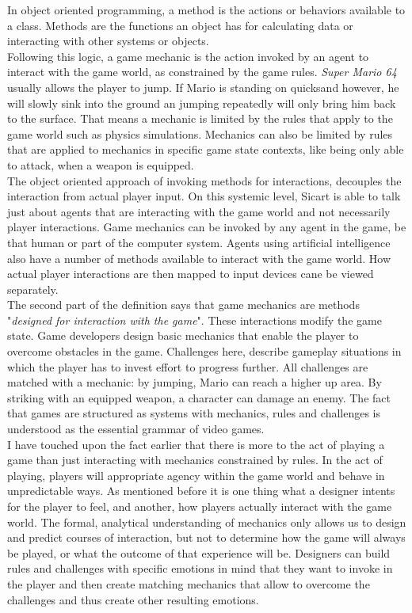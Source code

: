 In object oriented programming, a method is the actions or behaviors available to a class. Methods are the functions an object has for calculating data or interacting with other systems or objects.~\cite{Weisfeld2008}\\
Following this logic, a game mechanic is the action invoked by an agent to interact with the game world, as constrained by the game rules. \textit{Super Mario 64}~\cite{mario64} usually allows the player to jump. If Mario is standing on quicksand however, he will slowly sink into the ground an jumping repeatedly will only bring him back to the surface. That means a mechanic is limited by the rules that apply to the game world such as physics simulations. Mechanics can also be limited by rules that are applied to mechanics in specific game state contexts, like being only able to attack, when a weapon is equipped.\\
The object oriented approach of invoking methods for interactions, decouples the interaction from actual player input. On this systemic level, Sicart is able to talk just about agents that are interacting with the game world and not necessarily player interactions. Game mechanics can be invoked by any agent in the game, be that human or part of the computer system. Agents using artificial intelligence also have a number of methods available to interact with the game world. How actual player interactions are then mapped to input devices cane be viewed separately.\\
The second part of the definition says that game mechanics are methods "\textit{designed for interaction with the game}". These interactions modify the game state. Game developers design basic mechanics that enable the player to overcome obstacles in the game. Challenges here, describe gameplay situations in which the player has to invest effort to progress further. All challenges are matched with a mechanic: by jumping, Mario can reach a higher up area. By striking with an equipped weapon, a character can damage an enemy. The fact that games are structured as systems with mechanics, rules and challenges is understood as the essential grammar of video games.~\cite{Sicart2008}\\
I have touched upon the fact earlier that there is more to the act of playing a game than just interacting with mechanics constrained by rules. In the act of playing, players will appropriate agency within the game world and behave in unpredictable ways. As mentioned before it is one thing what a designer intents for the player to feel, and another, how players actually interact with the game world. The formal, analytical understanding of mechanics only allows us to design and predict courses of interaction, but not to determine how the game will always be played, or what the outcome of that experience will be. Designers can build rules and challenges with specific emotions in mind that they want to invoke in the player and then create matching mechanics that allow to overcome the challenges and thus create other resulting emotions.\\

